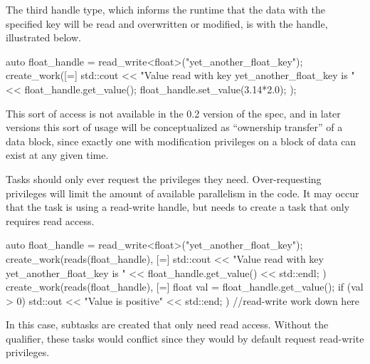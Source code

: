 The third handle type, which informs the runtime that the data 
with the specified key will be read and overwritten or modified, 
is with the  handle, illustrated below. 
\begin{CppCode}
auto float_handle = read_write<float>("yet_another_float_key");
create_work([=] {
  std::cout << "Value read with key yet_another_float_key is " 
          << float_handle.get_value();
  float_handle.set_value(3.14*2.0);
});
\end{CppCode}
This sort of access is not available in the 0.2 version of the spec, and in
later versions this sort of usage will be conceptualized as ``ownership
transfer'' of a data block, since exactly one  with
modification privileges on a block of data can exist at any given time.

Tasks should only ever request the privileges they need. 
Over-requesting privileges will limit the amount of available parallelism in the code.
It may occur that the task is using a read-write handle, but needs to create a
task that only requires read access.

\begin{CppCode}
auto float_handle = read_write<float>("yet_another_float_key");
create_work(reads(float_handle), [=] {
  std::cout << "Value read with key yet_another_float_key is " 
          << float_handle.get_value() << std::endl;
})
create_work(reads(float_handle), [=] {
  float val = float_handle.get_value();
  if (val > 0) std::out << "Value is positive" << std::end;
})
//read-write work down here
\end{CppCode}
In this case, subtasks are created that only need read access. 
Without the  qualifier, these tasks would conflict since they
would by default request read-write privileges.

